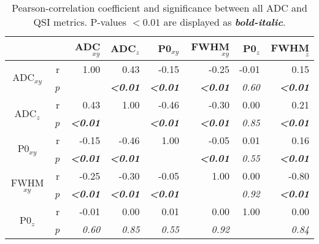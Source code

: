 \begin{table}[tb]
\begin{captionframe}
 \caption[Pearson-correlation coefficient and significance between all ADC and QSI metrics.]{Pearson-correlation coefficient and significance between all ADC and QSI metrics. P-values $<0.01$ are displayed as \textbf{\textit{bold-italic}}.}
\label{tab:chapter5 exp2 correlations}	
\end{captionframe}
\begin{tableframe}
 \centering
 \begin{adjustbox}{width=0.9\textwidth,keepaspectratio}
 \begin{minipage}{\textwidth}
	\centering
    \begin{tabular}{rrrrrrrr}
    \addlinespace
    \toprule
              &       & ADC$_{xy}$  & ADC$_{z}$  & P0$_{xy}$   & FWHM$_{xy}$   & P0$_{z}$   & FWHM$_{z}$ \\
    \midrule
    \multicolumn{1}{c}{\multirow{2}[0]{*}{ADC$_{xy}$}} & r   & 1.00  & 0.43  & -0.15 & -0.25 & -0.01 & 0.15 \\
    \multicolumn{1}{c}{} & \textit{p} & \textit{} & \textbf{\textit{<0.01}} & \textbf{\textit{<0.01}} & \textbf{\textit{<0.01}} & \textit{0.60} & \textbf{\textit{<0.01}} \\
    \multicolumn{1}{c}{\multirow{2}[0]{*}{ADC$_{z}$}} & r   & 0.43  & 1.00  & -0.46 & -0.30 & 0.00  & 0.21 \\
    \multicolumn{1}{c}{} & \textit{p} & \textbf{\textit{<0.01}} & \textit{} & \textbf{\textit{<0.01}} & \textbf{\textit{<0.01}} & \textit{0.85} & \textbf{\textit{<0.01}} \\
    \multicolumn{1}{c}{\multirow{2}[0]{*}{P0$_{xy}$}} & r   & -0.15 & -0.46 & 1.00  & -0.05 & 0.01  & 0.16 \\
    \multicolumn{1}{c}{} & \textit{p} & \textbf{\textit{<0.01}} & \textbf{\textit{<0.01}} & \textit{} & \textbf{\textit{<0.01}} & \textit{0.55} & \textbf{\textit{<0.01}} \\
    \multicolumn{1}{c}{\multirow{2}[0]{*}{FWHM$_{xy}$}} & r   & -0.25 & -0.30 & -0.05 & 1.00  & 0.00  & -0.80 \\
    \multicolumn{1}{c}{} & \textit{p} & \textbf{\textit{<0.01}} & \textbf{\textit{<0.01}} & \textbf{\textit{<0.01}} & \textit{} & \textit{0.92} & \textbf{\textit{<0.01}} \\
    \multicolumn{1}{c}{\multirow{2}[0]{*}{P0$_{z}$}} & r   & -0.01 & 0.00  & 0.01  & 0.00  & 1.00  & 0.00 \\
    \multicolumn{1}{c}{} & \textit{p} & \textit{0.60} & \textit{0.85} & \textit{0.55} & \textit{0.92} & \textit{} & \textit{0.84} \\

\end{tabular}
\end{minipage}
\end{adjustbox}
\end{tableframe}
\end{table}
